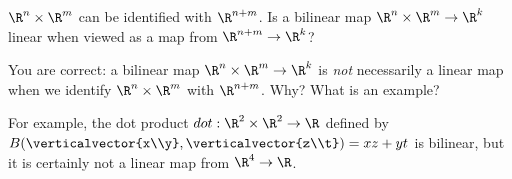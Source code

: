 \documentclass{ximera}
\begin{document}
\begin{question}
  $\R^n \times \R^m$ can be identified with $\R^{n+m}$.  Is a bilinear
  map $\R^n \times \R^m \to \R^k$ linear when viewed as a map from
  $\R^{n+m} \to \R^k$?  

  \begin{solution}
    \begin{multiple-choice}
    \end{multiple-choice}
  \end{solution}

  You are correct: a bilinear map $\R^n \times \R^m \to \R^k$ is
  \textit{not} necessarily a linear map when we identify $\R^n \times
  \R^m$ with $\R^{n+m}$.  Why?  What is an example?
  \begin{free-response}
    For example, the dot product $dot:\R^2 \times \R^2 \to \R$ defined
    by $B(\verticalvector{x\\y},\verticalvector{z\\t})=xz+yt$ is
    bilinear, but it is certainly not a linear map from $\R^4 \to \R$.
  \end{free-response}
\end{question}
\end{document}
